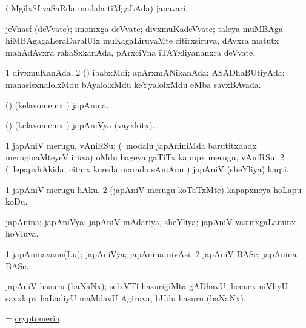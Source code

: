 \bentry
{}
\gl{\nA}
\bmng
(iMgilxSf vaSaRda modala tiMgaLAda) janavari. 
\emng
\eentry

\bentry
{}
\gl{\nA}
\bmng
jeVnasf (deVvate); imomxga deVvate; divxmuKadeVvate; taleya muMBAga hiMBAgagaLeraDaralUlx muKagaLiruvaMte citirxsiruva, dAvxra matutx mahAdAvxra rakaSxkanAda, pArxciVna iTAYxliyananxra deVvate. 
\emng
\eentry

\bentry
{}
\gl{\gu}
\bmng
\bnum
\num{1} divxmuKanAda. 
\num{2} (\rUpa) ibabxMdi; apArxmANikanAda; ASADhaBUtiyAda; manasisxnalolxMdu bAyalolxMdu keYyalolxMdu eMba savxBAvada. 
\enum
\emng
\eentry

\bentry
{}
\gl{\gu}
\bmng
(\AmA) (kelavomemx \hiV) japAnina. 
\emng
\eentry

\bentry
{}
\gl{\nA}
\bmng
(\AmA) (kelavomemx \hiV) japAniVya (vayxkitx). 
\emng
\eentry

\bentry
{}
\gl{\nA}
\bmng
\bnum
\num{1} japAniV merugu, vAniRSu; (\kanmu\ modalu japAniniMda barutitxdadx meruginaMteyeV iruva) oMdu bageya gaTiTx kapupx merugu, vAniRSu. 
\num{2} (\kanmu\ lepapxhAkida, citarx koreda marada sAmAnu \mo) japAniV (sheYliya) kaqti. 
\enum
\emng
\eentry

\bentry
{}
\gl{\sakirx}
\bmng
\bnum
\num{1} japAniV merugu hAku. 
\num{2} (japAniV merugu koTaTxMte) kapapxneya hoLapu koDu. 
\enum
\emng
\eentry

\bentry
{}
\gl{\gu}
\bmng
japAnina; japAniVya; japAniV mAdariya, sheYliya; japAniV vasutxgaLanunx hoVluva. 
\emng
\eentry

\bentry
{}
\gl{\nA}
\bmng
\bnum
\num{1} japAninavanu(Lu); japAniVya; japAnina nivAsi. 
\num{2} japAniV BASe; japAnina BASe. 
\enum
\emng
\eentry

\bentry
{}
\gl{\nA}
\bmng
japAniV hasuru (baNaNx); selxVTf hasurigiMta gADhavU, hecucx niVliyU savxlapx haLadiyU maMdavU Agiruva, bUdu hasuru (baNaNx). 
\emng
\eentry

\bentry
{}
\gl{\nA}
\bmng
= \hyperref{kandict_c.pdf}{C}{cryptomeria}{cryptomeria}. 
\emng
\eentry

